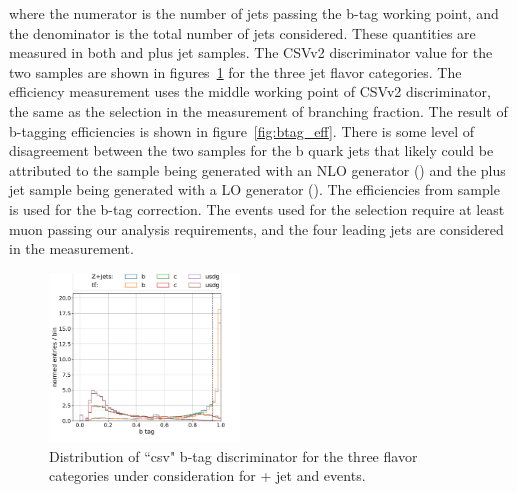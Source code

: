 \noindent where the numerator is the number of jets passing the b-tag working point, and the denominator is the total number of jets considered. These quantities are measured in both \ttbar and \PZ plus jet samples. The CSVv2 discriminator value for the two samples are shown in figures~\ref{fig:btag_csvv2} for the three jet flavor categories. The efficiency measurement uses the middle working point of CSVv2 discriminator, the same as the selection in the measurement of \PW branching fraction. The result of b-tagging efficiencies is shown in figure~\ref{fig:btag_eff}.  There is some level of disagreement between the two samples for the b quark jets that likely could be attributed to the \ttbar sample being generated with an NLO generator (\POWHEG) and the \PZ plus jet sample being generated with a LO generator (\MADGRAPH). The efficiencies from \ttbar sample is used for the b-tag correction. The events used for the selection require at least muon passing our analysis requirements, and the four leading \pt jets are considered in the measurement.

\begin{figure}[h!]
    \centering
    \includegraphics[width=0.45\textwidth]{chapters/Analysis/sectionCalibration/figures/btag/bmva_mc.pdf}
    \caption{Distribution of ``csv" b-tag discriminator for the three flavor categories under consideration for \PZ + jet and \ttbar events.      
    \label{fig:btag_csvv2}}
\end{figure}

